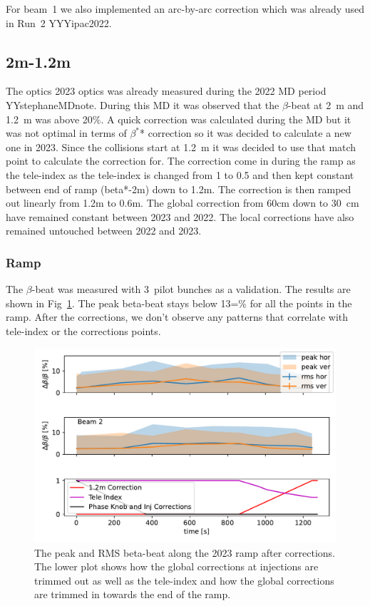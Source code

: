 \documentclass{cernatsnote}
\begin{document}
For beam~1 we also implemented an arc-by-arc correction which was already used in Run~2 YYYipac2022.

\subsection{2m-1.2m}
The optics 2023 optics was already measured during the 2022 MD period YYstephaneMDnote. During this MD it was observed that the $\beta$-beat at 2~m and 1.2~m was above 20\%. A quick correction was calculated during the MD but it was not optimal in terms of $\beta^*$* correction so it was decided to calculate a new one in 2023. Since the collisions start at 1.2~m it was decided to use that match point to calculate the correction for. The correction come in during the ramp as the tele-index as the tele-index is changed from 1 to 0.5 and then kept constant between end of ramp (beta*-2m) down to 1.2m. The correction is then ramped out linearly from 1.2m to 0.6m. The global correction from 60cm down to 30~cm have remained constant between 2023 and 2022. The local corrections have also remained untouched between 2022 and 2023. 
\subsubsection{Ramp}
The $\beta$-beat was measured with 3~pilot bunches as a validation. The results are shown in Fig~\ref{fig:ramp2023_with_all_info}. The peak beta-beat stays below 13=\% for all the points in the ramp. After the corrections, we don't observe any patterns that correlate with tele-index or the corrections points. 
\begin{figure}
    \centering
    \includegraphics{2023/ramp/rms_in_ramp_with_ats_factor.pdf}
    \caption{The peak and RMS beta-beat along the 2023 ramp after corrections. The lower plot shows how the global corrections at injections are trimmed out as well as the tele-index and how the global corrections are trimmed in towards the end of the ramp. }
    \label{fig:ramp2023_with_all_info}
\end{figure}
\end{document}
